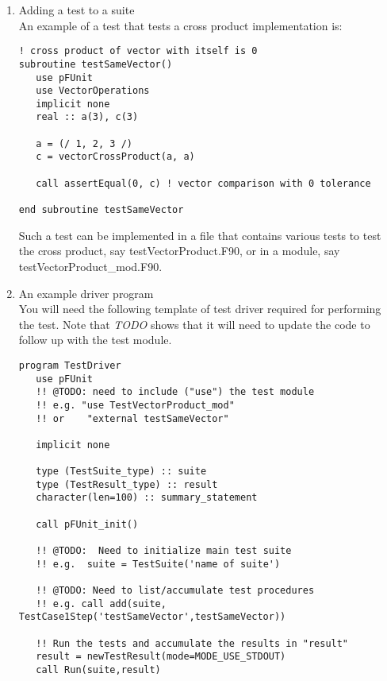 \documentclass[10pt]{article}
\begin{document}
\begin{enumerate}
\item Adding a test to a suite\\
An example of a test that tests a cross product implementation is:

\begin{verbatim}
! cross product of vector with itself is 0
subroutine testSameVector()
   use pFUnit
   use VectorOperations
   implicit none
   real :: a(3), c(3)

   a = (/ 1, 2, 3 /)
   c = vectorCrossProduct(a, a)
   
   call assertEqual(0, c) ! vector comparison with 0 tolerance
   
end subroutine testSameVector
\end{verbatim}

Such a test can be implemented in a file that contains various tests
to test the cross product, say testVectorProduct.F90, or in a
module,  say testVectorProduct\_mod.F90.

\item An example driver program\\
You will need the following template of test driver required for
performing the test.  Note that \emph{TODO} shows that it will need to
update the code to follow up with the test module.

\begin{verbatim}
program TestDriver
   use pFUnit
   !! @TODO: need to include ("use") the test module
   !! e.g. "use TestVectorProduct_mod"
   !! or    "external testSameVector"

   implicit none

   type (TestSuite_type) :: suite
   type (TestResult_type) :: result
   character(len=100) :: summary_statement

   call pFUnit_init()

   !! @TODO:  Need to initialize main test suite
   !! e.g.  suite = TestSuite('name of suite')

   !! @TODO: Need to list/accumulate test procedures
   !! e.g. call add(suite, TestCase1Step('testSameVector',testSameVector))

   !! Run the tests and accumulate the results in "result"
   result = newTestResult(mode=MODE_USE_STDOUT)
   call Run(suite,result)


\end{verbatim}
\end{enumerate}
\end{document}
